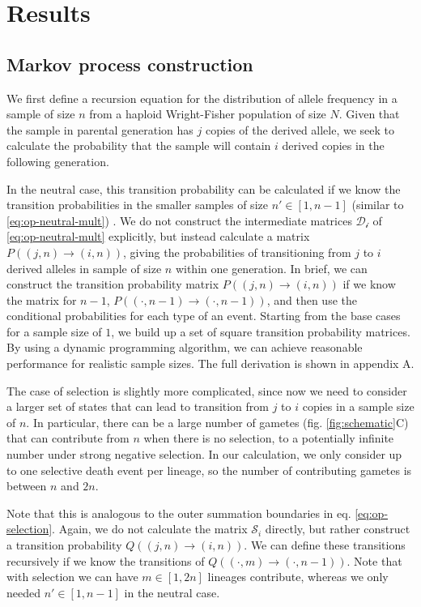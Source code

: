 \documentclass[review]{elsarticle}
\newcommand{\ra}{\rightarrow}
\begin{document}
\section{Results}
\label{sec:results}

\subsection{Markov process construction}
\label{subsec:markov}

We first define a recursion equation for the distribution of allele frequency in a sample of size
$n$ from a haploid Wright-Fisher population of size $N$. Given that the sample in parental generation
has $j$ copies of the derived allele, we seek to calculate the probability that the sample
will contain $i$ derived copies in the following generation.

In the neutral case, this transition probability can be calculated if we know the transition
probabilities in the smaller samples of size $n' \in [1, n-1]$ (similar to
\eqref{eq:op-neutral-mult}) \citep{BhaskarEtAl2014}. We do not construct the intermediate matrices
$\mathcal{D_i}$ of \eqref{eq:op-neutral-mult} explicitly, but instead calculate a matrix
$P((j,n)\ra(i,n))$, giving the probabilities of transitioning from $j$ to $i$ derived alleles in
sample of size $n$ within one generation. In brief, we can construct the transition probability
matrix $P((j,n)\ra(i,n))$ if we know the matrix for $n-1$, $P((\cdot,n-1)\ra(\cdot,n-1))$, and then
use the conditional probabilities for each type of an event. Starting from the base cases for a
sample size of $1$, we build up a set of square transition probability matrices. By using a dynamic
programming algorithm, we can achieve reasonable performance for realistic sample sizes. The full
derivation is shown in appendix A.

The case of selection is slightly more complicated, since now we need to consider a larger set of
states that can lead to transition from $j$ to $i$ copies in a sample size of $n$. In particular,
there can be a large number of gametes (fig. \ref{fig:schematic}C) that can contribute from $n$ when
there is no selection, to a potentially infinite number under strong negative selection. In our
calculation, we only consider up to one selective death event per lineage, so the number of
contributing gametes is between $n$ and $2n$.

Note that this is analogous to the outer summation boundaries in eq. \eqref{eq:op-selection}. Again,
we do not calculate the matrix $\mathcal{S}_i$ directly, but rather construct a transition
probability $Q((j,n)\ra(i,n))$. We can define these transitions recursively if we know the
transitions of $Q((\cdot,m)\ra(\cdot,n-1))$. Note that with selection we can have $m \in [1, 2n]$
lineages contribute, whereas we only needed $n' \in [1, n-1]$ in the neutral case.
\end{document}
